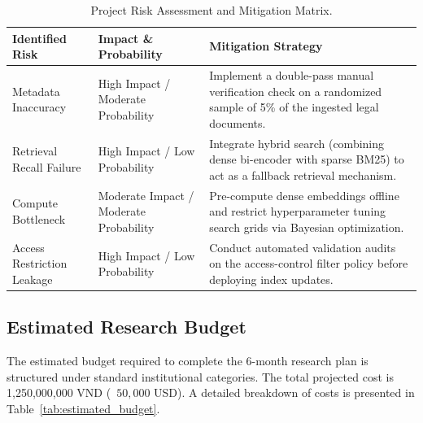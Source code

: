 \begin{table}[H]
\centering
\caption{Project Risk Assessment and Mitigation Matrix.}
\label{tab:risk_assessment}
\begin{tabularx}{\textwidth}{lXX}
\hline
\textbf{Identified Risk} & \textbf{Impact \& Probability} & \textbf{Mitigation Strategy} \\
\hline
Metadata Inaccuracy & High Impact / Moderate Probability & Implement a double-pass manual verification check on a randomized sample of 5\% of the ingested legal documents. \\
Retrieval Recall Failure & High Impact / Low Probability & Integrate hybrid search (combining dense bi-encoder with sparse BM25) to act as a fallback retrieval mechanism. \\
Compute Bottleneck & Moderate Impact / Moderate Probability & Pre-compute dense embeddings offline and restrict hyperparameter tuning search grids via Bayesian optimization. \\
Access Restriction Leakage & High Impact / Low Probability & Conduct automated validation audits on the access-control filter policy before deploying index updates. \\
\hline
\end{tabularx}
\end{table}

\subsection{Estimated Research Budget}
The estimated budget required to complete the 6-month research plan is structured under standard institutional categories. The total projected cost is 1,250,000,000 VND (~$50,000$ USD). A detailed breakdown of costs is presented in Table~\ref{tab:estimated_budget}.

